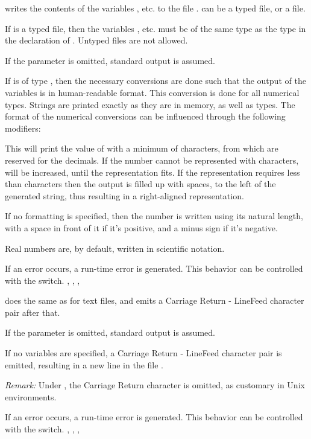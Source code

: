 \documentclass{report}
\begin{document}


{ writes the contents of the variables ,  etc. to
the file .  can be a typed file, or a  file.

If  is a typed file, then the variables ,  etc. must
be of the same type as the type in the declaration of . Untyped files
are not allowed.

If the parameter  is omitted, standard output is assumed. 

If  is of type , then the necessary conversions are done
such that the output of the variables is in human-readable format.
This conversion is done for all numerical types. Strings are printed exactly
as they are in memory, as well as  types. 
The format of the numerical conversions can be influenced through
the following modifiers:


This will print the value of  with a minimum of
 characters, from which  are reserved for the
decimals. If the number cannot be represented with  characters,
 will be increased, until the representation fits. If the
representation requires less than  characters then the output
is filled up with spaces, to the left of the generated string, thus
resulting in a right-aligned representation.

If no formatting is specified, then the number is written using its natural
length, with a space in front of it if it's positive, and a minus sign if
it's negative.

Real numbers are, by default, written in scientific notation.
}
{If an error occurs, a run-time error is generated. This behavior can be
controlled with the  switch. }
{, , ,  }

\procedure{Writeln}{[([Var F : Text;] [V1 [; V2; ... , Vn)]]}
{ does the same as  for text files, and emits a
Carriage Return - LineFeed character pair after that.

If the parameter  is omitted, standard output is assumed. 

If no variables are specified, a Carriage Return - LineFeed character pair
is emitted, resulting in a new line in the file .

{\em Remark:} Under \linux, the Carriage Return character is omitted, as
customary in Unix environments.
}
{If an error occurs, a run-time error is generated. This behavior can be
controlled with the  switch. }
{, , , }



%
% 
\printindex
\end{document}
